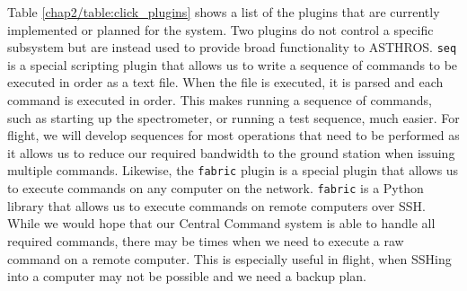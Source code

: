 Table \ref{chap2/table:click_plugins} shows a list of the plugins that are currently implemented or planned for the system.
Two plugins do not control a specific subsystem but are instead used to provide broad functionality to ASTHROS.
\texttt{seq} is a special scripting plugin that allows us to write a sequence of commands to be executed in order as a text file. 
When the file is executed, it is parsed and each command is executed in order.
This makes running a sequence of commands, such as starting up the spectrometer, or running a test sequence, much easier.
For flight, we will develop sequences for most operations that need to be performed as it allows us to reduce our required bandwidth to the ground station when issuing multiple commands. 
Likewise, the \texttt{fabric} plugin is a special plugin that allows us to execute commands on any computer on the network.
\texttt{fabric} is a Python library that allows us to execute commands on remote computers over SSH. 
While we would hope that our Central Command system is able to handle all required commands, there may be times when we need to execute a raw command on a remote computer.
This is especially useful in flight, when SSHing into a computer may not be possible and we need a backup plan.